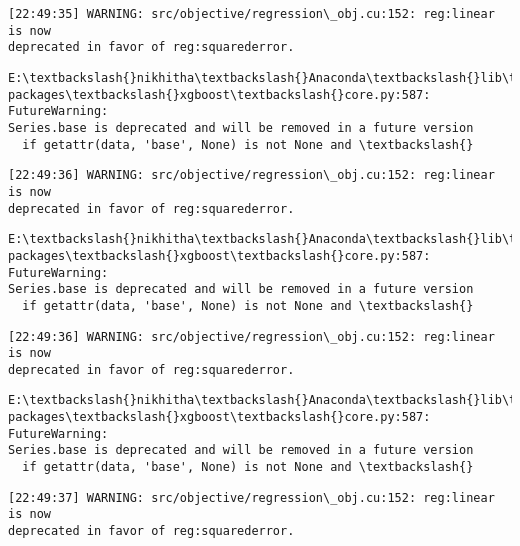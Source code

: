 \documentclass[11pt]{article}
\begin{document}
    \begin{Verbatim}[commandchars=\\\{\}]
[22:49:35] WARNING: src/objective/regression\_obj.cu:152: reg:linear is now
deprecated in favor of reg:squarederror.
    \end{Verbatim}

    \begin{Verbatim}[commandchars=\\\{\}]
E:\textbackslash{}nikhitha\textbackslash{}Anaconda\textbackslash{}lib\textbackslash{}site-packages\textbackslash{}xgboost\textbackslash{}core.py:587: FutureWarning:
Series.base is deprecated and will be removed in a future version
  if getattr(data, 'base', None) is not None and \textbackslash{}
    \end{Verbatim}

    \begin{Verbatim}[commandchars=\\\{\}]
[22:49:36] WARNING: src/objective/regression\_obj.cu:152: reg:linear is now
deprecated in favor of reg:squarederror.
    \end{Verbatim}

    \begin{Verbatim}[commandchars=\\\{\}]
E:\textbackslash{}nikhitha\textbackslash{}Anaconda\textbackslash{}lib\textbackslash{}site-packages\textbackslash{}xgboost\textbackslash{}core.py:587: FutureWarning:
Series.base is deprecated and will be removed in a future version
  if getattr(data, 'base', None) is not None and \textbackslash{}
    \end{Verbatim}

    \begin{Verbatim}[commandchars=\\\{\}]
[22:49:36] WARNING: src/objective/regression\_obj.cu:152: reg:linear is now
deprecated in favor of reg:squarederror.
    \end{Verbatim}

    \begin{Verbatim}[commandchars=\\\{\}]
E:\textbackslash{}nikhitha\textbackslash{}Anaconda\textbackslash{}lib\textbackslash{}site-packages\textbackslash{}xgboost\textbackslash{}core.py:587: FutureWarning:
Series.base is deprecated and will be removed in a future version
  if getattr(data, 'base', None) is not None and \textbackslash{}
    \end{Verbatim}

    \begin{Verbatim}[commandchars=\\\{\}]
[22:49:37] WARNING: src/objective/regression\_obj.cu:152: reg:linear is now
deprecated in favor of reg:squarederror.
    \end{Verbatim}
\end{document}
